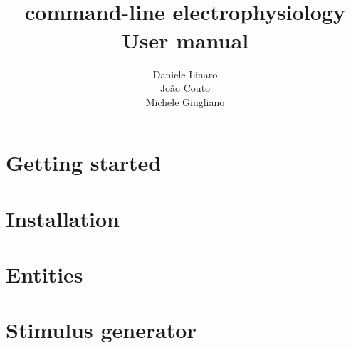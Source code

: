 \documentclass[10pt,a4paper,twoside]{book}
\title{\textbf{\progname} \\ command-line electrophysiology \\ User manual}
\author{Daniele Linaro \\ Jo\~ao Couto \\ Michele Giugliano}
\date{}
\begin{document}
\maketitle
\thispagestyle{empty}

\tableofcontents
\newpage
{}
\chapter{Getting started}
\label{chapter:start}


\chapter{Installation}
\label{chapter:install}



\chapter{Entities}
\label{chapter:entities}

\chapter{Stimulus generator}
\label{chapter:stimgen}



\end{document}
